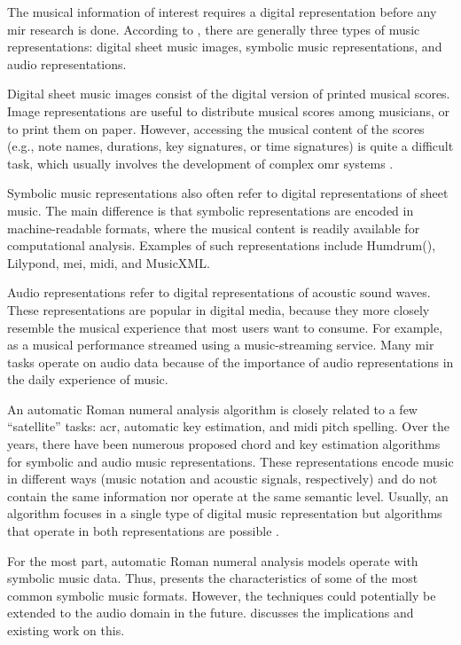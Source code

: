 


The musical information of interest requires a digital
representation before any \gls{mir} research is done.
According to \textcite{muller2015music}, there are generally
three types of music representations: digital sheet music
images, symbolic music representations, and audio
representations.

Digital sheet music images consist of the digital version of
printed musical scores. Image representations are useful to
distribute musical scores among musicians, or to print them
on paper. However, accessing the musical content of the
scores (e.g., note names, durations, key signatures, or time
signatures) is quite a difficult task, which usually
involves the development of complex \gls{omr} systems
\parencite{calvozaragoza2020understanding}.

Symbolic music representations also often refer to digital
representations of sheet music. The main difference is that
symbolic representations are encoded in machine-readable
formats, where the musical content is readily available for
computational analysis. Examples of such representations
include Humdrum(), Lilypond, \gls{mei},
\gls{midi}, and MusicXML.

Audio representations refer to digital representations of
acoustic sound waves. These representations are popular in
digital media, because they more closely resemble the
musical experience that most users want to consume. For
example, as a musical performance streamed using a
music-streaming service. Many \gls{mir} tasks operate on
audio data because of the importance of audio
representations in the daily experience of music.

An automatic Roman numeral analysis algorithm is closely
related to a few ``satellite'' tasks: \gls{acr}, automatic
key estimation, and \gls{midi} pitch spelling. Over the
years, there have been numerous proposed chord and key
estimation algorithms for symbolic and audio music
representations. These representations encode music in
different ways (music notation and acoustic signals,
respectively) and do not contain the same information nor
operate at the same semantic level. Usually, an algorithm
focuses in a single type of digital music representation but
algorithms that operate in both representations are possible
\parencite{napoleslopez2019keyfinding}.

For the most part, automatic Roman numeral analysis models
operate with symbolic music data. Thus,
 presents the
characteristics of some of the most common symbolic music
formats. However, the techniques could potentially be
extended to the audio domain in the future.
 discusses the
implications and existing work on this.
